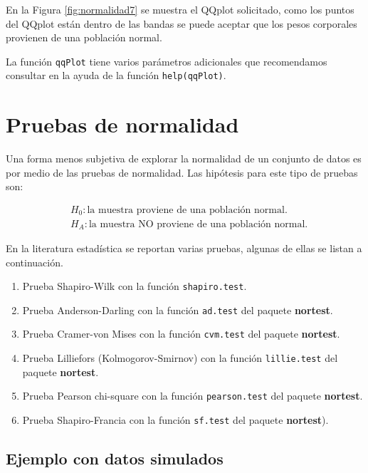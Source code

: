 \documentclass[10pt,]{krantz}
\providecommand{\tightlist}{%
  \setlength{\itemsep}{0pt}\setlength{\parskip}{0pt}}
\begin{document}
En la Figura \ref{fig:normalidad7} se muestra el QQplot solicitado, como
los puntos del QQplot están dentro de las bandas se puede aceptar que
los pesos corporales provienen de una población normal.

La función \texttt{qqPlot} tiene varios parámetros adicionales que
recomendamos consultar en la ayuda de la función \texttt{help(qqPlot)}.

\section{Pruebas de normalidad}\label{pruebas-de-normalidad}

Una forma menos subjetiva de explorar la normalidad de un conjunto de
datos es por medio de las pruebas de normalidad. Las hipótesis para este
tipo de pruebas son:

\begin{equation}
\begin{split}
&H_0: \text{la muestra proviene de una población normal.} \\
&H_A: \text{la muestra NO proviene de una población normal.}
\end{split}
\end{equation}

En la literatura estadística se reportan varias pruebas, algunas de
ellas se listan a continuación.

\begin{enumerate}
\def\labelenumi{\arabic{enumi}.}
\tightlist
\item
  Prueba Shapiro-Wilk con la función \texttt{shapiro.test}.
\item
  Prueba Anderson-Darling con la función \texttt{ad.test} del paquete
  \textbf{nortest}.
\item
  Prueba Cramer-von Mises con la función \texttt{cvm.test} del paquete
  \textbf{nortest}.
\item
  Prueba Lilliefors (Kolmogorov-Smirnov) con la función
  \texttt{lillie.test} del paquete \textbf{nortest}.
\item
  Prueba Pearson chi-square con la función \texttt{pearson.test} del
  paquete \textbf{nortest}.
\item
  Prueba Shapiro-Francia con la función \texttt{sf.test} del paquete
  \textbf{nortest}).
\end{enumerate}

\subsection*{Ejemplo con datos
simulados}\label{ejemplo-con-datos-simulados}
\end{document}
